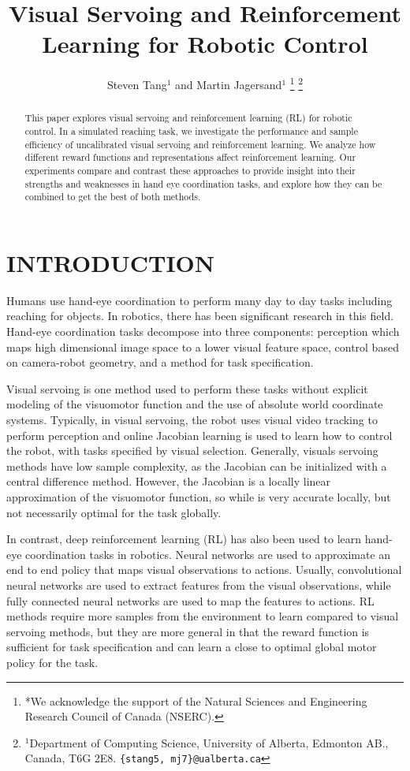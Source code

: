 \documentclass[letterpaper, 10 pt, conference]{ieeeconf}  %
\title{\LARGE \bf
Visual Servoing and Reinforcement Learning for Robotic Control
}
\author{Steven Tang$^{1}$ and Martin Jagersand$^{1}$%
\thanks{*We acknowledge the support of the Natural Sciences and Engineering Research
Council of Canada (NSERC).}%
\thanks{$^{1}$Department of Computing Science, University of Alberta, Edmonton
    AB., Canada, T6G 2E8. {\tt\small \{stang5, mj7\}@ualberta.ca}}%
}
\begin{document}
\maketitle
\thispagestyle{empty}
\pagestyle{empty}


\begin{abstract}
    This paper explores visual servoing and reinforcement learning (RL) for
    robotic control. In a simulated reaching task, we investigate the
    performance and sample efficiency of uncalibrated visual servoing and
    reinforcement learning. We analyze how different reward functions and
    representations affect reinforcement learning. Our experiments compare and
    contrast these approaches to provide insight into their strengths and
    weaknesses in hand eye coordination tasks, and explore how they can be
    combined to get the best of both methods.
\end{abstract}


\section{INTRODUCTION}

Humans use hand-eye coordination to perform many day to day tasks including
reaching for objects. In robotics, there has been significant research in this
field. Hand-eye coordination tasks decompose into three components: perception
which maps high dimensional image space to a lower visual feature space,
control based on camera-robot geometry, and a method for task specification.

Visual servoing is one method used to perform these tasks without explicit
modeling of the visuomotor function and the use of absolute world
coordinate systems. Typically, in visual servoing, the robot uses visual video
tracking to perform perception and online Jacobian learning is used to learn how
to control the robot, with tasks specified by visual selection.
\cite{Jagersand1995} Generally, visuals servoing methods have low sample
complexity, as the Jacobian can be initialized with a central difference method.
However, the Jacobian is a locally linear approximation of the visuomotor
function, so while is very accurate locally, but not necessarily optimal for
the task globally.

In contrast, deep reinforcement learning (RL) has also been used to learn
hand-eye coordination tasks in robotics. \cite{Levine15} Neural networks are
used to approximate an end to end policy that maps visual observations to
actions. Usually, convolutional neural networks are used to extract features
from the visual observations, while fully connected neural networks are used to
map the features to actions. RL methods require more samples from the
environment to learn compared to visual servoing methods, but they are more
general in that the reward function is sufficient for task specification and can
learn a close to optimal global motor policy for the task.
\end{document}
